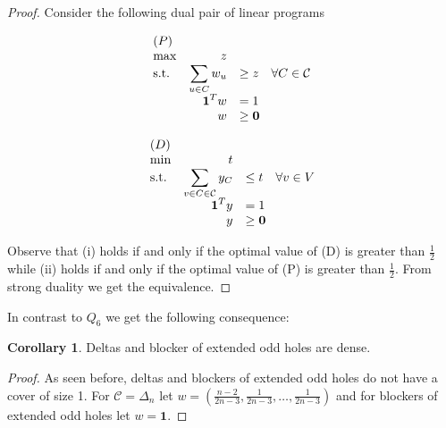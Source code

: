 \documentclass[a4paper, 12pt, twoside=false]{scrbook}
\theoremstyle{definition}
\newtheorem{corollary}[theorem]{Corollary}
\begin{document}
\begin{proof}
    Consider the following dual pair of linear programs
    \newline
    \newline
    \begin{minipage}{.5\linewidth}
        \begin{equation*}
            \begin{array}{l@{\quad} r l l}
                (P)\\
                \max          &z   \\
                \mathrm{s.t.}  &\displaystyle\sum\limits_{u\in C} w_u &\geq  z \quad \forall C \in \mathcal{C} \\
                    & \textbf{1}^Tw &=   1 \\
                    &   w &\geq   \textbf{0}
            \end{array}
        \end{equation*}
    \end{minipage}
    \begin{minipage}{.5\linewidth}
        \begin{equation*}
            \begin{array}{l@{\quad} r l l}
                (D)\\
                \min          &t   \\
                \mathrm{s.t.}  &\displaystyle\sum\limits_{v \in C \in \mathcal{C}} y_C &\leq  t \quad \forall v \in V \\
                    & \textbf{1}^Ty &=   1 \\
                    &   y &\geq   \textbf{0}
            \end{array}
        \end{equation*}
    \end{minipage}
    \newline
    \newline
    Observe that (i) holds if and only if the optimal value of (D) is greater than $\frac 12$ while (ii) holds if and only if the optimal value of (P) is greater than $\frac 12$.
    From strong duality we get the equivalence.
\end{proof}

In contrast to $Q_6$ we get the following consequence:
\begin{corollary}
    Deltas and blocker of extended odd holes are dense.
\end{corollary}

\begin{proof}
    As seen before, deltas and blockers of extended odd holes do not have a cover of size 1.
    For $\mathcal{C}=\Delta_n$ let $w=\left(\frac{n-2}{2n-3}, \frac 1{2n-3}, \ldots, \frac 1{2n-3}\right)$ and for blockers of extended odd holes let $w=\textbf{1}$.
\end{proof}
\end{document}
